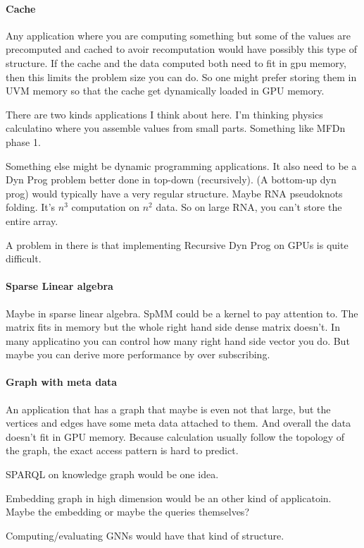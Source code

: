 \documentclass{article}
\begin{document}
\paragraph{Cache}
Any application where you are computing something but some of the
values are precomputed and cached to avoir recomputation would have
possibly this type of structure. If the cache and the data computed
both need to fit in gpu memory, then this limits the problem size you
can do. So one might prefer storing them in UVM memory so that the
cache get dynamically loaded in GPU memory.

There are two kinds applications I think about here. I'm thinking
physics calculatino where you assemble values from small
parts. Something like MFDn phase 1.

Something else might be dynamic programming applications.  It also
need to be a Dyn Prog problem better done in top-down
(recursively). (A bottom-up dyn prog) would typically have a very
regular structure.  Maybe RNA pseudoknots folding. It's $n^3$
computation on $n^2$ data. So on large RNA, you can't store the entire
array.

A problem in there is that implementing Recursive Dyn Prog on GPUs is
quite difficult.

\paragraph{Sparse Linear algebra}
Maybe in sparse linear algebra. SpMM could be a kernel to pay
attention to. The matrix fits in memory but the whole right hand side
dense matrix doesn't. In many applicatino you can control how many
right hand side vector you do. But maybe you can derive more
performance by over subscribing. 

\paragraph{Graph with meta data}
An application that has a graph that maybe is even not that large, but
the vertices and edges have some meta data attached to them. And
overall the data doesn't fit in GPU memory. Because calculation
usually follow the topology of the graph, the exact access pattern is
hard to predict.

SPARQL on knowledge graph would be one idea.

Embedding graph in high dimension would be an other kind of
applicatoin. Maybe the embedding or maybe the queries themselves?

Computing/evaluating GNNs would have that kind of structure.
\end{document}
